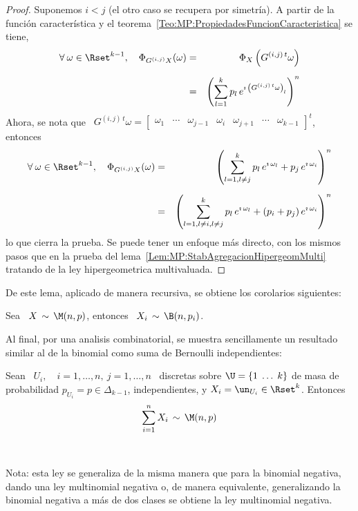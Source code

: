\begin{proof}
  Suponemos $i <  j$ (el otro caso  se recupera por simetr\'ia). A  partir de la
  funci\'on                 caracter\'istica                 y                el
  teorema~\ref{Teo:MP:PropiedadesFuncionCaracteristica} se tiene,
  \begin{eqnarray*}
  \forall \: \omega \in \Rset^{k-1}, \quad \Phi_{G^{(i,j)} X}(\omega) & = &
  \Phi_X\left( G^{(i,j) \, t} \omega \right)\\[2mm]
  & = & \left( \sum_{l=1}^k p_l \, e^{\imath \, \left( G^{(i,j) \, t} \omega \right)_l } \right)^n
  \end{eqnarray*}
  Ahora,  se nota  que \  $G^{(i,j) \,  t} \omega  = \begin{bmatrix}  \omega_1 &
    \cdots    &   \omega_{j-1}   &    \omega_i   &    \omega_{j+1}   &    \cdots   &
    \omega_{k-1} \end{bmatrix}^t$, entonces
  \begin{eqnarray*}
  \forall \: \omega \in \Rset^{k-1}, \quad \Phi_{G^{(i,j)} X}(\omega) & = &
  \left( \sum_{l=1, l \ne j}^k p_l \, e^{\imath \, \omega_l} + p_j \, e^{\imath \,
  \omega_i } \right)^n\\[2mm]
  & = & \left( \sum_{l=1, l \ne i, l \ne j}^k p_l \, e^{\imath \, \omega_l} +
  (p_i+p_j) \, e^{\imath \, \omega_i } \right)^n
  \end{eqnarray*}
  lo que  cierra la  prueba. Se puede  tener un  enfoque m\'as directo,  con los
  mismos         pasos        que         en        la         prueba        del
  lema~\ref{Lem:MP:StabAgregacionHipergeomMulti}    tratando     de    la    ley
  hipergeometrica multivaluada.
\end{proof}

De este lema, aplicado de manera recursiva, se obtiene los corolarios siguientes:
%
\begin{corolario}\label{Cor:MP:MarginalMultinomial}
%
  Sea  \ $X  \,  \sim \,  \M(n,p)$, entonces  \  $\displaystyle X_i  \, \sim  \,
  \B(n,p_i)$.
\end{corolario}


Al final, por una analisis  combinatorial, se muestra sencillamente un resultado
similar al de la binomial como suma de Bernoulli independientes:
%
\begin{lema}\label{Lem:MultinomialSumaMultiBernoulli}
%
  Sean \ $U_i, \quad i = 1, \ldots ,  n, \: j = 1, \ldots , n$ \ discretas sobre
  $\U  = \{  1 \;  \ldots \;  k \}$  de masa  de probabilidad  $p_{U_i} =  p \in
  \Delta_{k-1}$, independientes, y $X_i = \un_{U_i} \in \Rset^k$. Entonces
  \[
  \sum_{i=1}^n X_i \, \sim \, \M(n,p)
  \]
\end{lema}

\

Nota: esta ley  se generaliza de la misma manera que  para la binomial negativa,
dando una  ley multinomial negativa  o, de manera equivalente,  generalizando la
binomial  negativa  a  m\'as  de  dos  clases  se  obtiene  la  ley  multinomial
negativa. 
